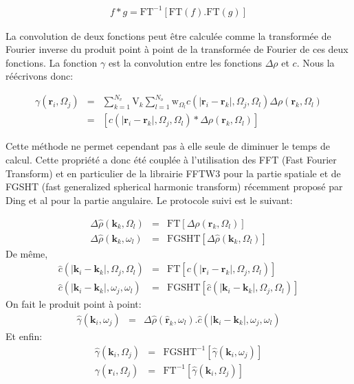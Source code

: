 \begin{eqnarray}
f*g = \mathrm{FT}^{-1} [ \mathrm{FT}(f) . \mathrm{FT}(g) ]
\end{eqnarray}

La convolution de deux fonctions peut être calculée comme la transformée de Fourier inverse du produit point à point de la transformée de Fourier de ces deux fonctions. La fonction $\gamma$ est la convolution entre les fonctions $\Delta\rho$ et $c$. Nous la réécrivons donc:

\begin{eqnarray}
\gamma\left(\boldsymbol{r}_i,\Omega_j\right) &=& \sum\limits_{k=1}^{N_v}\mathrm{V}_k\sum\limits_{l=1}^{N_o} \mathrm{w}_{\Omega_l}c\left(\left|\boldsymbol{r}_i-\boldsymbol{r}_k\right|,\Omega_j,\Omega_l \right) \Delta\rho\left(\boldsymbol{r}_k,\Omega_l\right) \\
&=& [ c\left(\left|\boldsymbol{r}_i-\boldsymbol{r}_k\right|,\Omega_j,\Omega_l \right) * \Delta\rho\left(\boldsymbol{r}_k,\Omega_l\right) ]
\end{eqnarray}


Cette méthode ne permet cependant pas à elle seule de diminuer le temps de calcul. Cette propriété a donc été couplée à l'utilisation des FFT (Fast Fourier Transform) et en particulier de la librairie FFTW3 pour la partie spatiale et de FGSHT (fast generalized spherical harmonic transform) récemment proposé par Ding et al\cite{ding_thesis} pour la partie angulaire. Le protocole suivi est le suivant:

\begin{eqnarray}
\Delta\hat{\rho}\left(\boldsymbol{k}_k,\Omega_l\right) &=& \mathrm{FT}[\Delta\rho\left(\boldsymbol{r}_k,\Omega_l\right)] \\
\Delta\hat{\rho}\left(\boldsymbol{k}_k,\omega_l\right) &=& \mathrm{FGSHT}[\Delta\hat{\rho}\left(\boldsymbol{k}_k,\Omega_l\right)]
\end{eqnarray}
De même,
\begin{eqnarray}
\hat{c}\left(\left|\boldsymbol{k}_i-\boldsymbol{k}_k\right|,\Omega_j,\Omega_l \right) &=& \mathrm{FT}[c\left(\left|\boldsymbol{r}_i-\boldsymbol{r}_k\right|,\Omega_j,\Omega_l \right)] \\
\hat{c}\left(\left|\boldsymbol{k}_i-\boldsymbol{k}_k\right|,\omega_j,\omega_l \right) &=& \mathrm{FGSHT}[\hat{c}\left(
\left|\boldsymbol{k}_i-\boldsymbol{k}_k\right|,\Omega_j,\Omega_l \right)]
\end{eqnarray}
On fait le produit point à point:
\begin{eqnarray}
\hat{\gamma}(\boldsymbol{k}_i,\omega_j) &=& \Delta\hat{\rho}\left(\boldsymbol{\hat{r}}_k,\omega_l\right) . \hat{c}\left(\left|\boldsymbol{k}_i-\boldsymbol{k}_k\right|,\omega_j,\omega_l \right)
\end{eqnarray}
Et enfin:
\begin{eqnarray}
\hat{\gamma}(\boldsymbol{k}_i,\Omega_j) &=& \mathrm{FGSHT}^{-1}[\hat{\gamma}(\boldsymbol{k}_i,\omega_j)]\\
\gamma(\boldsymbol{r}_i,\Omega_j) &=& \mathrm{FT}^{-1}[\hat{\gamma}(\boldsymbol{k}_i,\Omega_j)]
\end{eqnarray}

